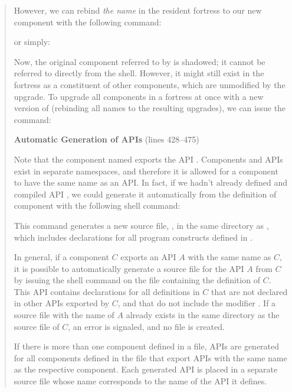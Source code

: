 \begin{description}
\begin{quote}
However, we can rebind \emph{the name} 
in the resident fortress to our new component with the following command:


or simply:


Now, the original component referred to by  is
shadowed; it cannot be referred to directly from the shell.
However, it might still exist in the fortress as a constituent of
other components, which are unmodified by the upgrade.
To upgrade all components in a fortress at once
with a new version of  (rebinding all
names to the resulting upgrades), we can issue the command:


\textbf{Automatic Generation of APIs} (lines 428--475)

Note that the component named  exports the API
. Components and APIs exist in separate namespaces, and therefore
it is allowed for a component to have the same name as an API.
In fact, if we hadn't already defined and compiled API ,
we could generate it automatically
from the definition of component 
with the following shell command:


This command generates a new source file, , in the
same directory as , which includes declarations for
all program constructs defined in .

In general, if a component $C$ exports an API $A$ with the same name as $C$,
it is possible to automatically generate a source file
for the API $A$ from $C$
by issuing the shell command  on the file
containing the definition of $C$.
This API contains declarations for all definitions in $C$ that are not
declared in other APIs exported by $C$, and that do not include
the modifier .
If a source file with the name of $A$ already exists in the
same directory as the source file of $C$, an error is signaled,
and no file is created.

If there is more than one component defined in a file,
APIs are generated for all components defined in the file that
export APIs with the same name as the respective component.
Each generated API is placed in a separate source file whose
name corresponds to the name of the API it defines.


\end{quote}
\end{description}
